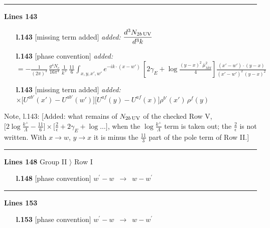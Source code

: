 \documentclass[10pt]{article}
\newenvironment{notebox}{\def\FrameCommand{{\color{notebar}\vrule width 1.5pt}\hspace{6pt}}\MakeFramed{\advance\hsize-\width\FrameRestore}\small}{\endMakeFramed}
\begin{document}
\noindent\rule{\linewidth}{0.3pt}\par\noindent\textbf{Lines 143} \par
\begin{itemize}[leftmargin=2.2em,itemsep=1pt,topsep=2pt]
\item[\textbf{l.143}] \textsf{\small [missing term added]} \emph{added:} $\displaystyle \frac{d^{3}N_{2b\,\rm UV}}{d^{3}k}$
\item[\textbf{l.143}] \textsf{\small [phase convention]} \emph{added:} $\displaystyle =-\frac{1}{(2\pi)^{3}}\,\frac{g^{4}N_{c}}{16\pi^{4}}\,\frac{1}{k^{+}}\,\frac{11}{6}\int_{x,y,x',w'}e^{-ik\cdot(x-w')}\,[2\gamma_{E}+\log\frac{(y-x)^{2}\,\bar\mu^{2}_{\overline{MS}}}{4}]\frac{(x'-w')\cdot(y-x)}{(x'-w')^{2}\,(y-x)^{2}}$
\item[\textbf{l.143}] \textsf{\small [missing term added]} \emph{added:} $\displaystyle \times\Big[U^{ab'}(x')-U^{ab'}(w')\Big]\Big[U^{af}(y)-U^{af}(x)\Big]\rho^{b'}(x')\,\rho^{f}(y)$
\end{itemize}
\begin{notebox}\textsf{\small Note, l.143:} [Added: what remains of $N_{2b\,\rm UV}$ of the checked Row V, $\big[2\log\frac{k^{+}}{\Lambda}-\frac{11}{6}\big]\times$$\big[\frac{2}{\epsilon}+2\gamma_{E}+\log\dots\big]$, when the $\log\frac{k^{+}}{\Lambda}$ term is taken out; the $\frac{2}{\epsilon}$ is not written. With $x\to w$, $y\to x$ it is minus the $\frac{11}{3}$ part of the pole term of Row II.]\end{notebox}
\noindent\rule{\linewidth}{0.3pt}\par\noindent\textbf{Lines 148} \quad \textsf{Group II $\rangle$ Row I} \par
\begin{itemize}[leftmargin=2.2em,itemsep=1pt,topsep=2pt]
\item[\textbf{l.148}] \textsf{\small [phase convention]} $\displaystyle w^{\prime}-w$\ $\longrightarrow$\ $\displaystyle w-w^{\prime}$
\end{itemize}
\noindent\rule{\linewidth}{0.3pt}\par\noindent\textbf{Lines 153} \par
\begin{itemize}[leftmargin=2.2em,itemsep=1pt,topsep=2pt]
\item[\textbf{l.153}] \textsf{\small [phase convention]} $\displaystyle w^{\prime}-w$\ $\longrightarrow$\ $\displaystyle w-w^{\prime}$
\end{itemize}
\end{document}
